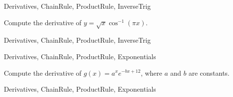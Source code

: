 	
\begin{tagblock}{Derivatives, ChainRule, ProductRule, InverseTrig}
\begin{question}
	

Compute the derivative of $y=\sqrt{x} \cos^{-1}(\pi x)$. 



	
\begin{tags}
	    Derivatives, ChainRule, ProductRule, InverseTrig
\end{tags}
	
\begin{diary}
\end{diary}
	
\begin{solution}
	   
\end{solution}
	
\end{question}

\end{tagblock}



	
\begin{tagblock}{Derivatives, ChainRule, ProductRule, Exponentials}
\begin{question}
	

Compute the derivative of $g(x) = a^x e^{-bx+12}$, where $a$ and  $b$ are constants.



	
\begin{tags}
	    Derivatives, ChainRule, ProductRule, Exponentials
\end{tags}
	
\begin{diary}
\end{diary}
	
\begin{solution}
	   
\end{solution}
	
\end{question}

\end{tagblock}



